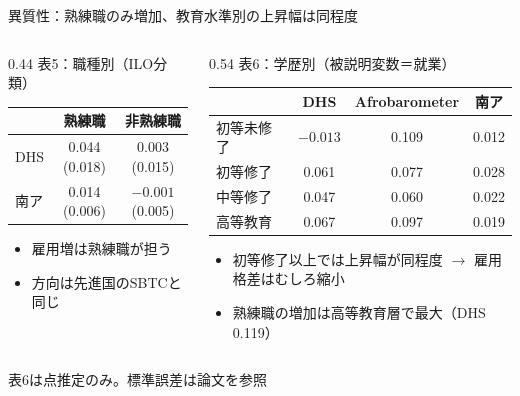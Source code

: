 \documentclass[aspectratio=169,11pt]{beamer}
\newcommand{\src}[1]{\par\vfill{\scriptsize\color{gray}#1}}
\begin{document}
\begin{frame}{異質性：熟練職のみ増加、教育水準別の上昇幅は同程度}
  \begin{columns}[T]
    \begin{column}{0.44\textwidth}
      \small 表5：職種別（ILO分類）\\[0.2em]
      \begin{tabular}{lcc}
        \toprule
        & 熟練職 & 非熟練職 \\
        \midrule
        DHS & 0.044 (0.018) & 0.003 (0.015) \\
        南ア & 0.014 (0.006) & $-0.001$ (0.005) \\
        \bottomrule
      \end{tabular}
      \vspace{0.4em}
      \begin{itemize}\small
        \item 雇用増は\alert{熟練職}が担う
        \item 方向は先進国のSBTCと同じ
      \end{itemize}
    \end{column}
    \begin{column}{0.54\textwidth}
      \small 表6：学歴別（被説明変数＝就業）\\[0.2em]
      \begin{tabular}{lccc}
        \toprule
        & DHS & Afrobarometer & 南ア \\
        \midrule
        初等未修了 & $-0.013$ & 0.109 & 0.012 \\
        初等修了 & 0.061 & 0.077 & 0.028 \\
        中等修了 & 0.047 & 0.060 & 0.022 \\
        高等教育 & 0.067 & 0.097 & 0.019 \\
        \bottomrule
      \end{tabular}
      \vspace{0.4em}
      \begin{itemize}\small
        \item 初等修了以上では上昇幅が\alert{同程度} $\to$ 雇用格差はむしろ縮小
        \item 熟練職の増加は高等教育層で最大（DHS 0.119）
      \end{itemize}
    \end{column}
  \end{columns}
  \src{表6は点推定のみ。標準誤差は論文を参照}
\end{frame}
\end{document}
